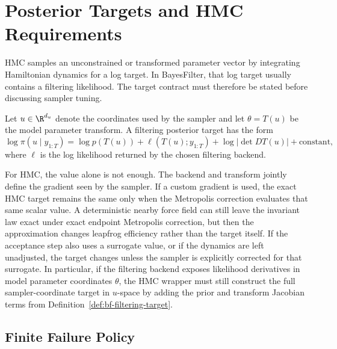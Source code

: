 \chapter{Posterior Targets and HMC Requirements}
\label{ch:bf-hmc-target-requirements}

HMC samples an unconstrained or transformed parameter vector by integrating
Hamiltonian dynamics for a log target.  In BayesFilter, that log target usually
contains a filtering likelihood.  The target contract must therefore be stated
before discussing sampler tuning.

\begin{definition}
\label{def:bf-filtering-target}
Let $u \in \R^{d_u}$ denote the coordinates used by the sampler and let
$\theta = T(u)$ be the model parameter transform.  A filtering posterior target
has the form
\[
  \log \pi(u \mid y_{1:T})
  =
  \log p(T(u))
  + \ell(T(u); y_{1:T})
  + \log\left|\det DT(u)\right|
  + \text{constant},
\]
where $\ell$ is the log likelihood returned by the chosen filtering backend.
\end{definition}

For HMC, the value alone is not enough.  The backend and transform jointly
define the gradient seen by the sampler.  If a custom gradient is used, the exact HMC target remains the same only when the Metropolis correction evaluates that same scalar value. A deterministic nearby force field can still leave the invariant law exact under exact endpoint Metropolis correction, but then the approximation changes leapfrog efficiency rather than the target itself. If the acceptance step also uses a surrogate value, or if the dynamics are left unadjusted, the target changes unless the sampler is explicitly corrected for that surrogate.  In
particular, if the filtering backend exposes likelihood derivatives in model
parameter coordinates \(\theta\), the HMC wrapper must still construct the full
sampler-coordinate target in \(u\)-space by adding the prior and transform
Jacobian terms from Definition~\ref{def:bf-filtering-target}.

\section{Finite Failure Policy}
\label{sec:bf-finite-failure-policy}

